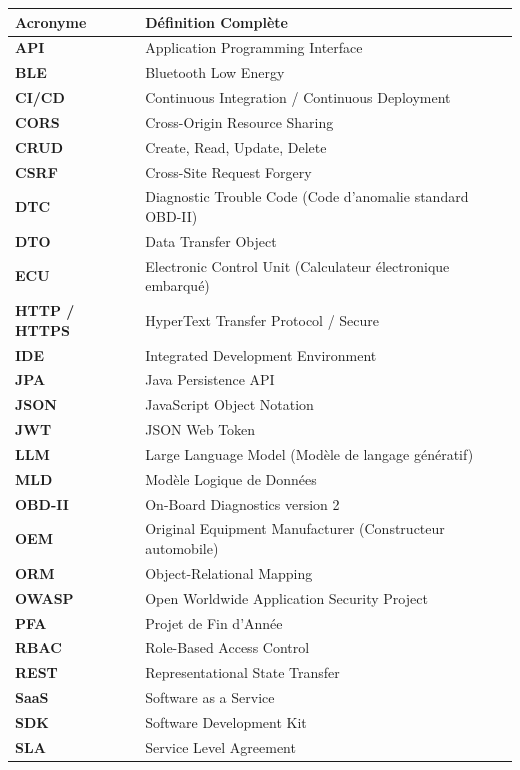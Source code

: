 \documentclass[12pt,a4paper,oneside]{report}
\begin{document}
\begin{table}[H]
\centering
\small
\begin{tabularx}{\textwidth}{p{3.2cm} X}
\toprule
\textbf{Acronyme} & \textbf{D\'efinition Compl\`ete} \\
\midrule
\textbf{API} & Application Programming Interface \\
\textbf{BLE} & Bluetooth Low Energy \\
\textbf{CI/CD} & Continuous Integration / Continuous Deployment \\
\textbf{CORS} & Cross-Origin Resource Sharing \\
\textbf{CRUD} & Create, Read, Update, Delete \\
\textbf{CSRF} & Cross-Site Request Forgery \\
\textbf{DTC} & Diagnostic Trouble Code (Code d'anomalie standard OBD-II) \\
\textbf{DTO} & Data Transfer Object \\
\textbf{ECU} & Electronic Control Unit (Calculateur \'electronique embarqu\'e) \\
\textbf{HTTP / HTTPS} & HyperText Transfer Protocol / Secure \\
\textbf{IDE} & Integrated Development Environment \\
\textbf{JPA} & Java Persistence API \\
\textbf{JSON} & JavaScript Object Notation \\
\textbf{JWT} & JSON Web Token \\
\textbf{LLM} & Large Language Model (Mod\`ele de langage g\'en\'eratif) \\
\textbf{MLD} & Mod\`ele Logique de Donn\'ees \\
\textbf{OBD-II} & On-Board Diagnostics version 2 \\
\textbf{OEM} & Original Equipment Manufacturer (Constructeur automobile) \\
\textbf{ORM} & Object-Relational Mapping \\
\textbf{OWASP} & Open Worldwide Application Security Project \\
\textbf{PFA} & Projet de Fin d'Ann\'ee \\
\textbf{RBAC} & Role-Based Access Control \\
\textbf{REST} & Representational State Transfer \\
\textbf{SaaS} & Software as a Service \\
\textbf{SDK} & Software Development Kit \\
\textbf{SLA} & Service Level Agreement \\

\end{tabularx}
\end{table}
\end{document}
